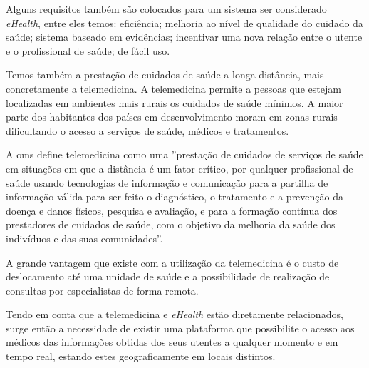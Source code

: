 \par
Alguns requisitos tamb\'em s\~ao colocados \cite{ehealth} para um sistema ser considerado \textit{eHealth}, entre eles temos: efici\^encia; melhoria ao n\'ivel de qualidade do cuidado da sa\'ude; sistema baseado em evid\^encias; incentivar uma nova rela\c c\~ao entre o utente e o profissional de sa\'ude; de f\'acil uso.
\par
Temos também a presta\c c\~ao de cuidados de sa\'ude a longa dist\^ancia, mais concretamente a telemedicina. A telemedicina permite a pessoas que estejam localizadas em ambientes mais rurais os cuidados de sa\'ude m\'inimos. A maior parte dos habitantes dos pa\'ises em desenvolvimento moram em zonas rurais dificultando o acesso a servi\c cos de sa\'ude, m\'edicos e tratamentos.\cite{telemedicine-future}
\par
A \gls{oms} define telemedicina como \cite{ehealth_telemedicine} uma ''presta\c c\~ao de cuidados de servi\c cos de sa\'ude em situa\c c\~oes em que a dist\^ancia \'e um fator cr\'itico, por qualquer profissional de sa\'ude usando tecnologias de informa\c c\~ao e comunica\c c\~ao para a partilha de informa\c c\~ao v\'alida para ser feito o diagn\'ostico, o tratamento e a preven\c c\~ao da doen\c ca e danos f\'isicos, pesquisa e avalia\c c\~ao, e para a forma\c c\~ao cont\'inua dos prestadores de cuidados de sa\'ude, com o objetivo da melhoria da sa\'ude dos indiv\'iduos e das suas comunidades''.
\par
A grande vantagem que existe com a utiliza\c c\~ao da telemedicina \'e o custo de deslocamento at\'e uma unidade de sa\'ude e a possibilidade de realiza\c c\~ao de consultas por especialistas de forma remota.
\par
Tendo em conta que a telemedicina e \textit{eHealth}  estão diretamente relacionados, surge ent\~ao a necessidade de existir uma plataforma que possibilite o acesso aos m\'edicos das informa\c c\~oes obtidas dos seus utentes a qualquer momento e em tempo real, estando estes geograficamente em locais distintos.


